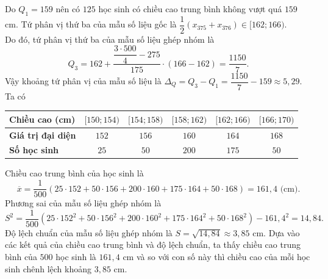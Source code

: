 \begin{ex}
{\begin{itemchoice}
		Do $Q_1= 159$ nên có $125$ học sinh có chiều cao trung bình không vượt quá $159$ cm.
		\itemch Tứ phân vị thứ ba của mẫu số liệu gốc là $\dfrac{1}{2}(x_{375} + x_{376}) \in [162; 166)$.\\
		Do đó, tứ phân vị thứ ba của mẫu số liệu ghép nhóm là
		$$ Q_3 = 162 + \dfrac{\dfrac{3\cdot 500}{4} - 275}{175} \cdot (166 - 162) = \dfrac{1150}{7}.$$
		Vậy khoảng tứ phân vị của mẫu số liệu là $\Delta _Q = Q_3 - Q_1 = \dfrac{1150}{7} - 159 \approx 5{,}29$.
		\itemch Ta có
		\begin{center}
			\begin{tabular}{|l|c|c|c|c|c|}
				\hline
				\textbf{Chiều cao (cm)} & $[150; 154)$ & $ [154; 158)$ & $ [158; 162)$ & $ [162; 166)$ & $ [166; 170)$   \\
				\hline
				\textbf{Giá trị đại diện} & $152$ & $ 156 $ & $160$ & $164$ & $168$ \\
				\hline
				\textbf{Số học sinh }&$25$ & $50$ & $200$ & $175$ & $50$ \\
				\hline
			\end{tabular}
		\end{center}
		\noindent
		Chiều cao trung bình của học sinh là 
		$$\overline{x} = \dfrac{1}{500}(25\cdot 152 + 50\cdot 156 + 200\cdot 160 + 175\cdot 164 + 50\cdot 168) = 161{,}4 \text{ (cm)}.$$
		Phương sai của mẫu số liệu ghép nhóm là
		$$S^2 = \dfrac{1}{500} \left(25\cdot 152^2 + 50\cdot 156^2 + 200\cdot 160^2 + 175\cdot 164^2 + 50\cdot 168^2 \right) - 161{,}4^2 = 14{,}84. $$
		Độ lệch chuẩn của mẫu số liệu ghép nhóm là $S = \sqrt{14{,}84} \approx 3{,}85$ cm.
		\itemch Dựa vào các kết quả của chiều cao trung bình và độ lệch chuẩn, ta thấy chiều cao trung bình của $500$ học sinh là $161{,}4$ cm và so với con số này thì chiều cao của mỗi học sinh chênh lệch khoảng $3{,}85$ cm.
	\end{itemchoice}	
	}
\end{ex}

